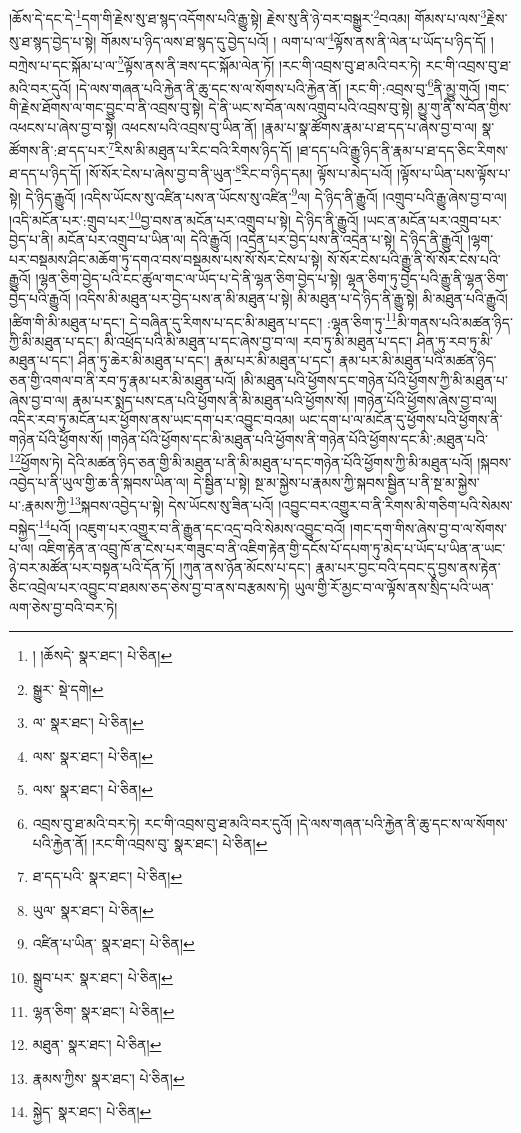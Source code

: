 །ཆོས་དེ་དང་དེ་\footnote{། །ཆོསདེ་  སྣར་ཐང་།  པེ་ཅིན། }དག་གི་རྗེས་སུ་ཐ་སྙད་འདོགས་པའི་རྒྱུ་སྟེ། རྗེས་སུ་ནི་ཉེ་བར་བསྒྱུར་\footnote{སྒྱུར་  སྡེ་དགེ། }བའམ། གོམས་པ་ལས་\footnote{ལ་  སྣར་ཐང་།  པེ་ཅིན། }རྗེས་སུ་ཐ་སྙད་བྱེད་པ་སྟེ། གོམས་པ་ཉིད་ལས་ཐ་སྙད་དུ་བྱེད་པའོ། །
ལག་པ་ལ་\footnote{ལས་  སྣར་ཐང་།  པེ་ཅིན། }ལྟོས་ནས་ནི་ལེན་པ་ཡོད་པ་ཉིད་དོ། །བཀྲེས་པ་དང་སྐོམ་པ་ལ་\footnote{ལས་  སྣར་ཐང་།  པེ་ཅིན། }ལྟོས་ནས་ནི་ཟས་དང་སྐོམ་ལེན་ཏོ། །རང་གི་འབྲས་བུ་ཐ་མའི་བར་ཏེ། རང་གི་འབྲས་བུ་ཐ་མའི་བར་དུའོ། །དེ་ལས་གཞན་པའི་རྐྱེན་ནི་ཆུ་དང་ས་ལ་སོགས་པའི་རྐྱེན་ནོ། །རང་གི་:འབྲས་བུ་\footnote{འབྲས་བུ་ཐ་མའི་བར་ཏེ། རང་གི་འབྲས་བུ་ཐ་མའི་བར་དུའོ། །དེ་ལས་གཞན་པའི་རྐྱེན་ནི་ཆུ་དང་ས་ལ་སོགས་པའི་རྐྱེན་ནོ། །རང་གི་འབྲས་བུ་  སྣར་ཐང་།  པེ་ཅིན། }ནི་མྱུ་གུའོ། །གང་གི་རྗེས་ཐོགས་ལ་གང་བྱུང་བ་ནི་འབྲས་བུ་སྟེ། དེ་ནི་ཡང་ས་བོན་ལས་འགྲུབ་པའི་འབྲས་བུ་སྟེ། མྱུ་གུ་ནི་ས་བོན་གྱིས་འཕངས་པ་ཞེས་བྱ་བ་སྟེ། འཕངས་པའི་འབྲས་བུ་ཡིན་ནོ། །རྣམ་པ་སྣ་ཚོགས་རྣམ་པ་ཐ་དད་པ་ཞེས་བྱ་བ་ལ། སྣ་ཚོགས་ནི་:ཐ་དད་པར་\footnote{ཐ་དད་པའི་  སྣར་ཐང་།  པེ་ཅིན། }རིས་མི་མཐུན་པ་རིང་བའི་རིགས་ཉིད་དོ། །ཐ་དད་པའི་རྒྱུ་ཉིད་ནི་རྣམ་པ་ཐ་དད་ཅིང་རིགས་ཐ་དད་པ་ཉིད་དོ། །སོ་སོར་ངེས་པ་ཞེས་བྱ་བ་ནི་ཡུན་\footnote{ཡུལ་  སྣར་ཐང་།  པེ་ཅིན། }རིང་བ་ཉིད་དམ། ལྟོས་པ་མེད་པའོ། །ལྟོས་པ་ཡིན་པས་ལྟོས་པ་སྟེ། དེ་ཉིད་རྒྱུའོ། །འདིས་ཡོངས་སུ་འཛིན་པས་ན་ཡོངས་སུ་འཛིན་\footnote{འཛིན་པ་ཡིན་  སྣར་ཐང་།  པེ་ཅིན། }ལ། དེ་ཉིད་ནི་རྒྱུའོ། །འགྲུབ་པའི་རྒྱུ་ཞེས་བྱ་བ་ལ། །འདི་མངོན་པར་:གྲུབ་པར་\footnote{སྒྲུབ་པར་  སྣར་ཐང་།  པེ་ཅིན། }བྱ་བས་ན་མངོན་པར་འགྲུབ་པ་སྟེ། དེ་ཉིད་ནི་རྒྱུའོ། །ཡང་ན་མངོན་པར་འགྲུབ་པར་བྱེད་པ་ནི། མངོན་པར་འགྲུབ་པ་ཡིན་ལ། དེའི་རྒྱུའོ། །འདྲེན་པར་བྱེད་པས་ནི་འདྲེན་པ་སྟེ། དེ་ཉིད་ནི་རྒྱུའོ། །ལྷག་པར་བསྡམས་ཤིང་མཆོག་ཏུ་དགའ་བས་བསྡམས་པས་སོ་སོར་ངེས་པ་སྟེ། སོ་སོར་ངེས་པའི་རྒྱུ་ནི་སོ་སོར་ངེས་པའི་རྒྱུའོ། །ལྷན་ཅིག་བྱེད་པའི་ངང་ཚུལ་གང་ལ་ཡོད་པ་དེ་ནི་ལྷན་ཅིག་བྱེད་པ་སྟེ། ལྷན་ཅིག་ཏུ་བྱེད་པའི་རྒྱུ་ནི་ལྷན་ཅིག་བྱེད་པའི་རྒྱུའོ། །འདིས་མི་མཐུན་པར་བྱེད་པས་ན་མི་མཐུན་པ་སྟེ། མི་མཐུན་པ་དེ་ཉིད་ནི་རྒྱུ་སྟེ། མི་མཐུན་པའི་རྒྱུའོ། །ཚིག་གི་མི་མཐུན་པ་དང་། དེ་བཞིན་དུ་རིགས་པ་དང་མི་མཐུན་པ་དང་། :ལྷན་ཅིག་ཏུ་\footnote{ལྷན་ཅིག་  སྣར་ཐང་།  པེ་ཅིན། }མི་གནས་པའི་མཚན་ཉིད་ཀྱི་མི་མཐུན་པ་དང་། མི་འཕྲོད་པའི་མི་མཐུན་པ་དང་ཞེས་བྱ་བ་ལ། རབ་ཏུ་མི་མཐུན་པ་དང་། ཤིན་ཏུ་རབ་ཏུ་མི་མཐུན་པ་དང་། ཤིན་ཏུ་ཆེར་མི་མཐུན་པ་དང་། རྣམ་པར་མི་མཐུན་པ་དང་། རྣམ་པར་མི་མཐུན་པའི་མཚན་ཉིད་ཅན་གྱི་འགལ་བ་ནི་རབ་ཏུ་རྣམ་པར་མི་མཐུན་པའོ། །མི་མཐུན་པའི་ཕྱོགས་དང་གཉེན་པོའི་ཕྱོགས་ཀྱི་མི་མཐུན་པ་ཞེས་བྱ་བ་ལ། རྣམ་པར་སྨད་པས་ངན་པའི་ཕྱོགས་ནི་མི་མཐུན་པའི་ཕྱོགས་སོ། །གཉེན་པོའི་ཕྱོགས་ཞེས་བྱ་བ་ལ། འདིར་རབ་ཏུ་མངོན་པར་ཕྱོགས་ནས་ཡང་དག་པར་འབྱུང་བའམ། ཡང་དག་པ་ལ་མངོན་དུ་ཕྱོགས་པའི་ཕྱོགས་ནི་གཉེན་པོའི་ཕྱོགས་སོ། །གཉེན་པོའི་ཕྱོགས་དང་མི་མཐུན་པའི་ཕྱོགས་ནི་གཉེན་པོའི་ཕྱོགས་དང་མི་:མཐུན་པའི་\footnote{མཐུན་  སྣར་ཐང་།  པེ་ཅིན། }ཕྱོགས་ཏེ། དེའི་མཚན་ཉིད་ཅན་གྱི་མི་མཐུན་པ་ནི་མི་མཐུན་པ་དང་གཉེན་པོའི་ཕྱོགས་ཀྱི་མི་མཐུན་པའོ། །སྐབས་འབྱེད་པ་ནི་ཡུལ་གྱི་ཆ་ནི་སྐབས་ཡིན་ལ། དེ་སྦྱིན་པ་སྟེ། སྔ་མ་སྐྱེས་པ་རྣམས་ཀྱི་སྐབས་སྦྱིན་པ་ནི་སྔ་མ་སྐྱེས་པ་:རྣམས་ཀྱི་\footnote{རྣམས་ཀྱིས་  སྣར་ཐང་།  པེ་ཅིན། }སྐབས་འབྱེད་པ་སྟེ། དེས་ཡོངས་སུ་ཟིན་པའོ། །འབྱུང་བར་འགྱུར་བ་ནི་རིགས་མི་གཅིག་པའི་སེམས་བསྐྱེད་\footnote{སྐྱེད་  སྣར་ཐང་།  པེ་ཅིན། }པའོ། །འཇུག་པར་འགྱུར་བ་ནི་རྒྱུན་དང་འདྲ་བའི་སེམས་འབྱུང་བའོ། །གང་དག་གིས་ཞེས་བྱ་བ་ལ་སོགས་པ་ལ། འཇིག་རྟེན་ན་འབྲུ་ཁོ་ན་ངེས་པར་གཟུང་བ་ནི་འཇིག་རྟེན་གྱི་དངོས་པོ་དཔག་ཏུ་མེད་པ་ཡོད་པ་ཡིན་ན་ཡང་ཉེ་བར་མཚོན་པར་བསྟན་པའི་དོན་ཏོ། །ཀུན་ནས་ཉོན་མོངས་པ་དང་། རྣམ་པར་བྱང་བའི་དབང་དུ་བྱས་ནས་རྟེན་ཅིང་འབྲེལ་པར་འབྱུང་བ་ཐམས་ཅད་ཅེས་བྱ་བ་ནས་བརྩམས་ཏེ། ཡུལ་གྱི་རོ་མྱང་བ་ལ་ལྟོས་ནས་སྲིད་པའི་ཡན་ལག་ཅེས་བྱ་བའི་བར་ཏེ། 